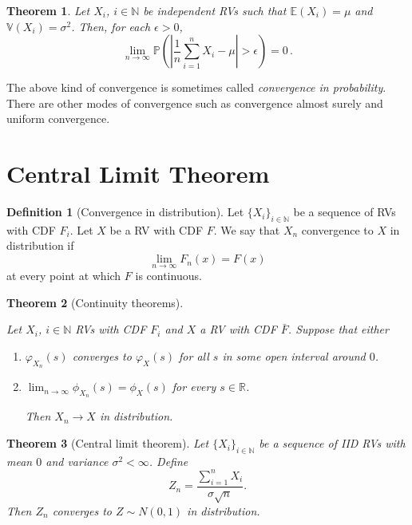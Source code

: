 \documentclass[
  openany]{book}
\newtheorem{theorem}{Theorem}[chapter]
\theoremstyle{definition}
\newtheorem{definition}{Definition}[chapter]
\theoremstyle{definition}
\theoremstyle{definition}
\theoremstyle{definition}
\theoremstyle{remark}
\begin{document}
\begin{theorem}
Let \(X_i\), \(i\in \mathbb{N}\) be independent RVs such that \(\mathbb{E}(X_i) = \mu\)
and \(\mathbb{V}(X_i) = \sigma^2\).
Then, for each \(\epsilon > 0\),
\[ \lim_{n\to \infty} \mathbb{P}\left( \left| \frac{1}{n} \sum_{i=1}^n X_i - \mu  \right| > \epsilon   \right) = 0 \,.\]
\end{theorem}

The above kind of convergence is sometimes called \emph{convergence in probability}.
There are other modes of convergence such as convergence almost surely and
uniform convergence.

\hypertarget{central-limit-theorem}{%
\section{Central Limit Theorem}\label{central-limit-theorem}}

\begin{definition}[Convergence in distribution]
Let \(\{X_i\}_{i \in \mathbb{N}}\) be a sequence of RVs with CDF \(F_i\).
Let \(X\) be a RV with CDF \(F\).
We say that \(X_n\) convergence to \(X\) in distribution if
\[ \lim_{n\to \infty} F_n (x) = F(x) \] at every point at which \(F\) is continuous.
\end{definition}

\begin{theorem}[Continuity theorems]
\protect\hypertarget{thm:cont}{}\label{thm:cont}

Let \(X_i\), \(i \in \mathbb{N}\) RVs with CDF \(F_i\) and \(X\) a RV with CDF \(\bar F\).
Suppose that either

\begin{enumerate}
\def\labelenumi{\arabic{enumi}.}
\item
  \(\varphi_{X_n}(s)\) converges to \(\varphi_X(s)\) for all \(s\) in some open interval around \(0\).
\item
  \(\lim_{n\to\infty} \phi_{X_n}(s) = \phi_X(s)\) for every \(s \in \mathbb{R}\).

  Then \(X_n \to X\) in distribution.
\end{enumerate}

\end{theorem}

\begin{theorem}[Central limit theorem]
Let \(\{ X_i \}_{i\in \mathbb{N}}\) be a sequence of IID RVs with mean \(0\) and
variance \(\sigma^2 < \infty\).
Define
\[ Z_n = \frac{\sum_{i=1}^n X_i}{\sigma \sqrt{n}}. \]
Then \(Z_n\) converges to \(Z \sim N(0,1)\) in distribution.
\end{theorem}
\end{document}
